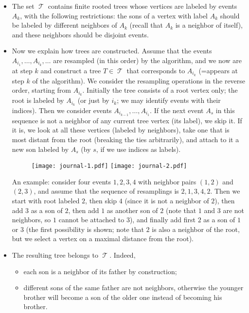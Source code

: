 \documentclass[12pt]{article}
\DeclareMathOperator{\Tr}{\mathcal{T}}
\begin{document}
\begin{itemize}
\item The set $\Tr$ contains finite rooted trees whose vertices are labeled by events $A_k$, with the following restrictions: the sons of a vertex with label $A_k$ should be labeled by different neighbors of $A_k$ (recall that $A_k$ is a neighbor of itself), and these neighbors should be disjoint events.

\item Now we explain how trees are constructed. Assume that the events $A_{i_1},\ldots, A_{i_k},\ldots$ are resampled (in this order) by the algorithm, and we now are at step $k$ and construct a tree $T\in \Tr$ that corresponds to $A_{i_k}$ (=appears at step $k$ of the algorithm). We consider the resampling operations in the reverse order, starting from $A_{i_k}$. Initially the tree consists of a root vertex only; the root is labeled by $A_{i_k}$ (or just by $i_k$; we may identify events with their indices). Then we consider events $A_{i_{k-1}},\ldots, A_{i_1}$. If the next event $A_s$ in this sequence is not a neighbor of any current tree vertex (its label), we skip it. If it is, we look at all these vertices (labeled by neighbors), take one that is most distant from the root (breaking the ties arbitrarily), and attach to it a new son labeled by $A_s$ (by $s$, if we use indices as labels).
\bigskip

\begin{figure}[h]
\begin{center}
\texttt{[image: journal-1.pdf]}\hspace*{20mm}
\texttt{[image: journal-2.pdf]}
\end{center}
\end{figure}
An example: consider four events $1,2,3,4$ with neighbor pairs $(1,2)$ and $(2,3)$, and assume that the sequence of resamplings is $2,1,3,4,2$. Then we start with root labeled $2$, then skip $4$ (since it is not a neighbor of $2$), then add $3$ as a son of $2$, then add $1$ as another son of $2$ (note that $1$ and $3$ are not neighbors, so $1$ cannot be attached to $3$), and finally add first $2$ as a son of $1$ or $3$ (the first possibility is shown; note that $2$ is also a neighbor of the root, but we select a vertex on a maximal distance from the root).

\item The resulting tree belongs to $\Tr$. Indeed,

\begin{itemize}
\item each son is a neighbor of its father by construction;
\item different sons of the same father are not neighbors, otherwise the younger brother will become a son of the older one instead of becoming his brother.
\end{itemize}


\end{itemize}
\end{document}
